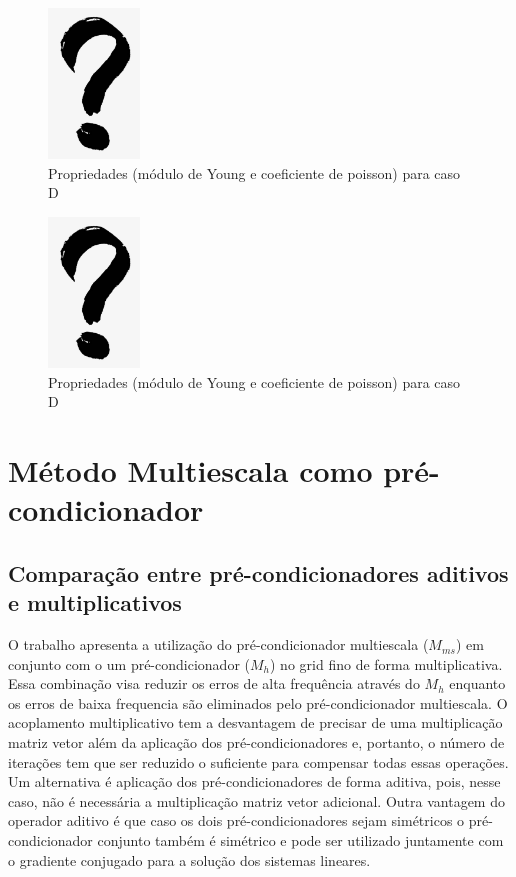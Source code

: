 \begin{figure}[!htbp]
    \label{fig:casoDgrid}
    \centering
    \includegraphics[height=4cm]{interrogacao.png}
    \caption{Propriedades (módulo de Young e coeficiente de poisson) para caso D }
\end{figure}

\begin{figure}[!htbp]
    \label{fig:casoEgrid}
    \centering
    \includegraphics[height=4cm]{interrogacao.png}
    \caption{Propriedades (módulo de Young e coeficiente de poisson) para caso D }
\end{figure}

\section{Método Multiescala como pré-condicionador}

\subsection{Comparação entre pré-condicionadores aditivos e multiplicativos}
O trabalho \cite{casteletto} apresenta a utilização do pré-condicionador multiescala ($M_{ms}$) em conjunto com o um pré-condicionador ($M_h$) no grid fino de forma multiplicativa. 
Essa combinação visa reduzir os erros de alta frequência através do $M_h$ enquanto os erros de baixa frequencia são eliminados pelo pré-condicionador multiescala. 
O acoplamento multiplicativo tem a desvantagem de precisar de uma multiplicação matriz vetor além da aplicação dos pré-condicionadores
e, portanto, o número de iterações tem que ser reduzido o suficiente para compensar todas essas operações. Um alternativa é aplicação
dos pré-condicionadores de forma aditiva, pois, nesse caso, não é necessária a multiplicação matriz vetor adicional. Outra vantagem do operador
aditivo é que caso os dois pré-condicionadores sejam simétricos o pré-condicionador conjunto também é simétrico e pode ser utilizado juntamente
com o gradiente conjugado para a solução dos sistemas lineares.


